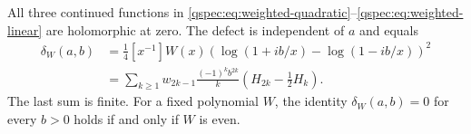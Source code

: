 \begin{theorem}
\label{qspec:thm:anomaly}
All three continued functions in
\eqref{qspec:eq:weighted-quadratic}--\eqref{qspec:eq:weighted-linear} are
holomorphic at zero. The defect is independent of $a$ and equals
\begin{align}
\delta_W(a,b)
&=\frac14[x^{-1}]W(x)
\left(\log(1+ib/x)-\log(1-ib/x)\right)^2\label{qspec:eq:anomaly-residue}\\
&=\sum_{k\ge1}w_{2k-1}\frac{(-1)^k b^{2k}}{k}
\left(H_{2k}-\frac12H_k\right).
\label{qspec:eq:anomaly-harmonic}
\end{align}
The last sum is finite. For a fixed polynomial $W$, the identity
$\delta_W(a,b)=0$ for every $b>0$ holds if and only if $W$ is even.
\end{theorem}
